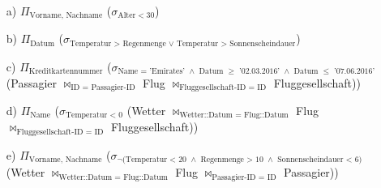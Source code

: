 \begin{itemize}


\item[a)]
$\Pi_{\text{Vorname, Nachname}}$ ($\sigma_{\text{Alter} < 30 }$)

\item[b)]
$\Pi_{\text{Datum}}$ ($\sigma_{\text{Temperatur > Regenmenge } \lor \text{ Temperatur > Sonnenscheindauer} }$)

\item[c)]
$\Pi_{\text{Kreditkartennummer}}$ ($\sigma_{\text{Name = 'Emirates' $\land$ Datum $\geq$ '02.03.2016' $\land$ Datum $\leq$ '07.06.2016'}}$  (Passagier $\bowtie_{\text{ID = Passagier-ID}}$ Flug $\bowtie_{\text{Fluggesellschaft-ID = ID}}$ Fluggesellschaft))

\item[d)]
$\Pi_{\text{Name}}$ ($\sigma_{\text{Temperatur < 0}}$ (Wetter $\bowtie_{\text{Wetter::Datum = Flug::Datum}}$ Flug $\bowtie_{\text{Fluggesellschaft-ID = ID}}$ Fluggesellschaft))

\item[e)]
$\Pi_{\text{Vorname, Nachname}}$ ($\sigma_{\neg\text{(Temperatur < 20 $\land$ Regenmenge > 10 $\land$ Sonnenscheindauer < 6)}}$ (Wetter $\bowtie_{\text{Wetter::Datum = Flug::Datum}}$ Flug $\bowtie_{\text{Passagier-ID = ID}}$ Passagier))

\end{itemize}




